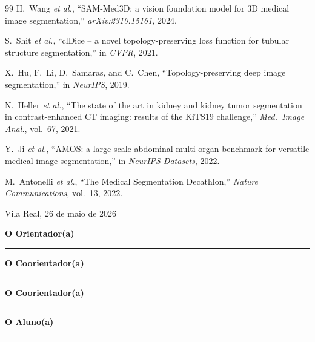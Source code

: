 \documentclass[a4paper,11pt,twoside]{article}
\begin{document}
\begin{thebibliography}{99}
H.~Wang \textit{et al.}, ``SAM-Med3D: a vision foundation model for 3D
medical image segmentation,'' \textit{arXiv:2310.15161}, 2024.

S.~Shit \textit{et al.}, ``clDice -- a novel topology-preserving loss
function for tubular structure segmentation,'' in \textit{CVPR}, 2021.

X.~Hu, F.~Li, D.~Samaras, and C.~Chen,
``Topology-preserving deep image segmentation,'' in \textit{NeurIPS}, 2019.

N.~Heller \textit{et al.}, ``The state of the art in kidney and kidney tumor
segmentation in contrast-enhanced CT imaging: results of the KiTS19
challenge,'' \textit{Med.\ Image Anal.}, vol.~67, 2021.

Y.~Ji \textit{et al.}, ``AMOS: a large-scale abdominal multi-organ benchmark
for versatile medical image segmentation,'' in \textit{NeurIPS Datasets},
2022.

M.~Antonelli \textit{et al.}, ``The Medical Segmentation Decathlon,''
\textit{Nature Communications}, vol.~13, 2022.

\end{thebibliography}

\clearpage
\thispagestyle{utad}
\vspace*{1.5cm}
\noindent Vila Real, 26 de maio de 2026

\vspace{2.2cm}
\begin{center}
  {\bfseries O Orientador(a)}\par
  \vspace{1.0cm}
  \rule{0.55\linewidth}{0.4pt}

  \vspace{2.2cm}
  {\bfseries O Coorientador(a)}\par
  \vspace{1.0cm}
  \rule{0.55\linewidth}{0.4pt}

  \vspace{2.2cm}
  {\bfseries O Coorientador(a)}\par
  \vspace{1.0cm}
  \rule{0.55\linewidth}{0.4pt}

  \vspace{2.2cm}
  {\bfseries O Aluno(a)}\par
  \vspace{1.0cm}
  \rule{0.55\linewidth}{0.4pt}
\end{center}
\end{document}
